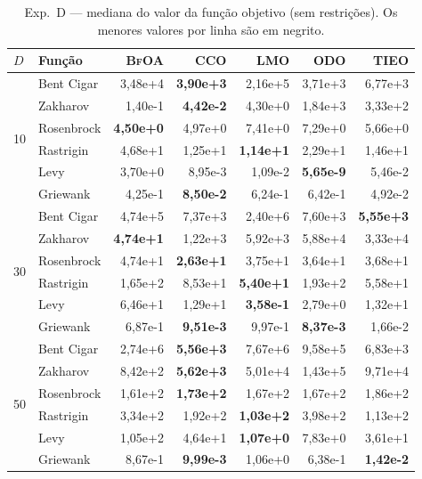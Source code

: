 \documentclass[12pt, a4paper]{article}
\newcommand{\alg}[1]{\textsc{#1}}
\begin{document}
\begin{table}[h!]
\centering
\caption{Exp.~D — mediana do valor da função objetivo (sem restrições).
  Os menores valores por linha são em negrito.}
\label{tab:exp_d}
\small
\begin{tabular}{llrrrrr}
\toprule
$D$ & Função & \alg{BfOA} & \alg{CCO} & \alg{LMO} & \alg{ODO} & \alg{TIEO} \\
\midrule
\multirow{6}{*}{10}
 & Bent Cigar  & 3{,}48e+4 & \textbf{3{,}90e+3} & 2{,}16e+5 & 3{,}71e+3 & 6{,}77e+3 \\
 & Zakharov    & 1{,}40e-1 & \textbf{4{,}42e-2} & 4{,}30e+0 & 1{,}84e+3 & 3{,}33e+2 \\
 & Rosenbrock  & \textbf{4{,}50e+0} & 4{,}97e+0 & 7{,}41e+0 & 7{,}29e+0 & 5{,}66e+0 \\
 & Rastrigin   & 4{,}68e+1 & 1{,}25e+1 & \textbf{1{,}14e+1} & 2{,}29e+1 & 1{,}46e+1 \\
 & Levy        & 3{,}70e+0 & 8{,}95e-3 & 1{,}09e-2 & \textbf{5{,}65e-9} & 5{,}46e-2 \\
 & Griewank    & 4{,}25e-1 & \textbf{8{,}50e-2} & 6{,}24e-1 & 6{,}42e-1 & 4{,}92e-2 \\
\midrule
\multirow{6}{*}{30}
 & Bent Cigar  & 4{,}74e+5 & 7{,}37e+3 & 2{,}40e+6 & 7{,}60e+3 & \textbf{5{,}55e+3} \\
 & Zakharov    & \textbf{4{,}74e+1} & 1{,}22e+3 & 5{,}92e+3 & 5{,}88e+4 & 3{,}33e+4 \\
 & Rosenbrock  & 4{,}74e+1 & \textbf{2{,}63e+1} & 3{,}75e+1 & 3{,}64e+1 & 3{,}68e+1 \\
 & Rastrigin   & 1{,}65e+2 & 8{,}53e+1 & \textbf{5{,}40e+1} & 1{,}93e+2 & 5{,}58e+1 \\
 & Levy        & 6{,}46e+1 & 1{,}29e+1 & \textbf{3{,}58e-1} & 2{,}79e+0 & 1{,}32e+1 \\
 & Griewank    & 6{,}87e-1 & \textbf{9{,}51e-3} & 9{,}97e-1 & \textbf{8{,}37e-3} & 1{,}66e-2 \\
\midrule
\multirow{6}{*}{50}
 & Bent Cigar  & 2{,}74e+6 & \textbf{5{,}56e+3} & 7{,}67e+6 & 9{,}58e+5 & 6{,}83e+3 \\
 & Zakharov    & 8{,}42e+2 & \textbf{5{,}62e+3} & 5{,}01e+4 & 1{,}43e+5 & 9{,}71e+4 \\
 & Rosenbrock  & 1{,}61e+2 & \textbf{1{,}73e+2} & 1{,}67e+2 & 1{,}67e+2 & 1{,}86e+2 \\
 & Rastrigin   & 3{,}34e+2 & 1{,}92e+2 & \textbf{1{,}03e+2} & 3{,}98e+2 & 1{,}13e+2 \\
 & Levy        & 1{,}05e+2 & 4{,}64e+1 & \textbf{1{,}07e+0} & 7{,}83e+0 & 3{,}61e+1 \\
 & Griewank    & 8{,}67e-1 & \textbf{9{,}99e-3} & 1{,}06e+0 & 6{,}38e-1 & \textbf{1{,}42e-2} \\
\bottomrule
\end{tabular}
\end{table}
\end{document}
